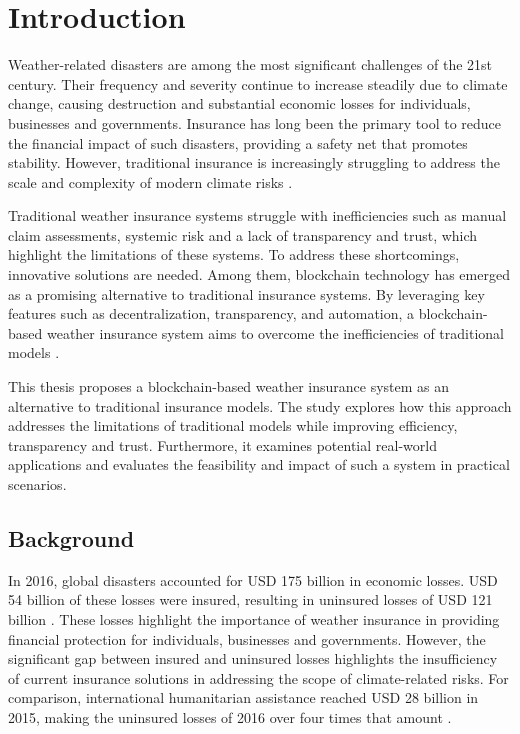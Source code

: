 \chapter{Introduction}\label{chapter:introduction} 

Weather-related disasters are among the most significant challenges of the 21st century. Their frequency and severity continue to increase steadily due to climate change, causing destruction and substantial economic losses for individuals, businesses and governments. Insurance has long been the primary tool to reduce the financial impact of such disasters, providing a safety net that promotes stability. However, traditional insurance is increasingly struggling to address the scale and complexity of modern climate risks \autocites{van2006impacts}{monasterolo2020climate}.

Traditional weather insurance systems struggle with inefficiencies such as manual claim assessments, systemic risk and a lack of transparency and trust, which highlight the limitations of these systems. To address these shortcomings, innovative solutions are needed. Among them, blockchain technology has emerged as a promising alternative to traditional insurance systems. By leveraging key features such as decentralization, transparency, and automation, a blockchain-based weather insurance system aims to overcome the inefficiencies of traditional models \autocites{Salem2021Developing}{Omar2023Blockchain-Based}.

This thesis proposes a blockchain-based weather insurance system as an alternative to traditional insurance models. The study explores how this approach addresses the limitations of traditional models while improving efficiency, transparency and trust. Furthermore, it examines potential real-world applications and evaluates the feasibility and impact of such a system in practical scenarios.


\section{Background}\label{section:background}
In 2016, global disasters accounted for USD 175 billion in economic losses. USD 54 billion of these losses were insured, resulting in uninsured losses of USD 121 billion \autocite{swissre2017}. These losses highlight the importance of weather insurance in providing financial protection for individuals, businesses and governments. However, the significant gap between insured and uninsured losses highlights the insufficiency of current insurance solutions in addressing the scope of climate-related risks. For comparison, international humanitarian assistance reached USD 28 billion in 2015, making the uninsured losses of 2016 over four times that amount \autocite{development2016humanitarian}.

